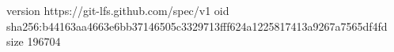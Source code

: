 version https://git-lfs.github.com/spec/v1
oid sha256:b44163aa4663e6bb37146505c3329713fff624a1225817413a9267a7565df4fd
size 196704
